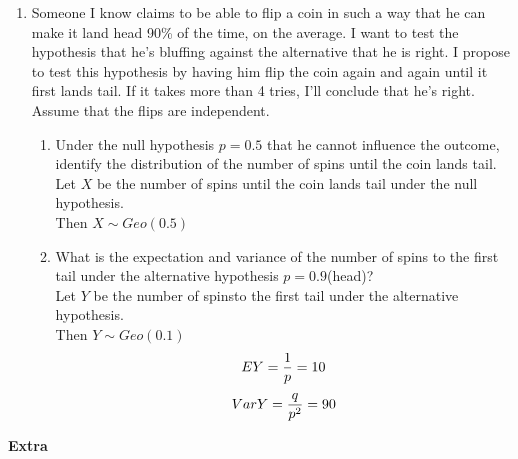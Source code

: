 \documentclass[12pt]{article}%
\newcommand{\0}{{\bf 0}}
\begin{document}
\begin{enumerate}
\item
Someone I know claims to be able to flip a coin in such a way that he can make it land head 90\% of the time, on the average. I want to test the hypothesis that he's bluffing against the alternative that he is right. I propose to test this hypothesis by having him flip the coin again and again until it first lands tail. If it takes more than 4 tries, I'll conclude that he's right. Assume that the flips are independent.
\begin{enumerate}
\item
Under the null hypothesis $p=0.5$ that he cannot influence the outcome, 
identify the distribution of the number of spins until the coin lands tail.
\\
{\color{blue}{\bf Sol.}}
Let $X$ be the number of spins until the coin lands tail under the null hypothesis.\\
Then $X \sim Geo(0.5)$
\item
What is the expectation and variance of the number of spins to the first tail under the alternative hypothesis $p=0.9$(head)?
\\
{\color{blue}{\bf Sol.}}
Let $Y$ be the number of spinsto the first tail under the alternative hypothesis.\\
Then $Y \sim Geo(0.1)$
$$EY=\frac{1}{p}=10$$
$$VarY=\frac{q}{p^2}=90$$

\end{enumerate}


\end{enumerate}
\vskip 0.3in





\begin{center}
{\Large\bf Extra} 
\end{center}
\end{document}
